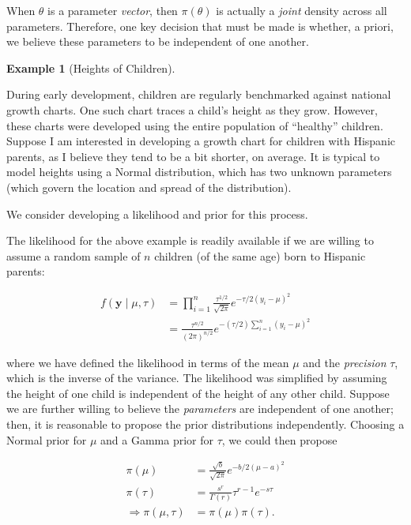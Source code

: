 \documentclass[
  letterpaper,
  DIV=11,
  numbers=noendperiod]{scrreprt}
\theoremstyle{definition}
\theoremstyle{plain}
\theoremstyle{definition}
\newtheorem{example}{Example}[chapter]
\theoremstyle{remark}
\begin{document}
When \(\theta\) is a parameter \emph{vector}, then \(\pi(\theta)\) is
actually a \emph{joint} density across all parameters. Therefore, one
key decision that must be made is whether, a priori, we believe these
parameters to be independent of one another.

\begin{example}[Heights of
Children]\protect\hypertarget{exm-heights}{}\label{exm-heights}

During early development, children are regularly benchmarked against
national growth charts. One such chart traces a child's height as they
grow. However, these charts were developed using the entire population
of ``healthy'' children. Suppose I am interested in developing a growth
chart for children with Hispanic parents, as I believe they tend to be a
bit shorter, on average. It is typical to model heights using a Normal
distribution, which has two unknown parameters (which govern the
location and spread of the distribution).

We consider developing a likelihood and prior for this process.

\end{example}

The likelihood for the above example is readily available if we are
willing to assume a random sample of \(n\) children (of the same age)
born to Hispanic parents:

\[
\begin{aligned}
  f(\mathbf{y} \mid \mu, \tau) 
    &= \prod_{i=1}^{n} \frac{\tau^{1/2}}{\sqrt{2\pi}} e^{-\tau/2 (y_i - \mu)^2} \\
    &= \frac{\tau^{n/2}}{(2\pi)^{n/2}} e^{-(\tau/2)\sum_{i=1}^{n}(y_i - \mu)^2}
\end{aligned}
\]

where we have defined the likelihood in terms of the mean \(\mu\) and
the \emph{precision} \(\tau\), which is the inverse of the variance. The
likelihood was simplified by assuming the height of one child is
independent of the height of any other child. Suppose we are further
willing to believe the \emph{parameters} are independent of one another;
then, it is reasonable to propose the prior distributions independently.
Choosing a Normal prior for \(\mu\) and a Gamma prior for \(\tau\), we
could then propose

\[
\begin{aligned}
  \pi(\mu) &= \frac{\sqrt{b}}{\sqrt{2\pi}} e^{-b/2 (\mu - a)^2} \\
  \pi(\tau) &= \frac{s^r}{\Gamma(r)} \tau^{r - 1} e^{-s\tau} \\
  \Rightarrow \pi(\mu, \tau) &= \pi(\mu) \pi(\tau).
\end{aligned}
\]
\end{document}
